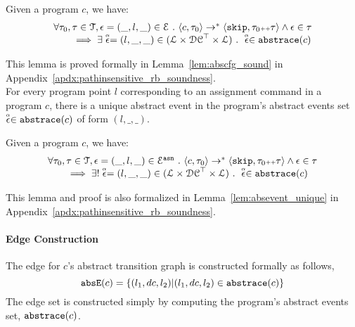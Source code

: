    \begin{lem}
     \label{lem:abscfg_sound}
   Given a program ${c}$, we have:
   \[
     \begin{array}{l}
       \forall \mathtt{\tau}_0, \mathtt{\tau} \in \mathcal{T} ,  \mathtt{\epsilon} = (\_, l, \_) \in \mathcal{E} ~.~
   \langle {c}, \mathtt{\tau}_0 \rangle \to^{*} \langle \mathtt{skip}, \mathtt{\tau}_0 {\scriptscriptstyle ++} \mathtt{\tau} \rangle 
   \land \mathtt{\epsilon} \in \mathtt{\tau} 
   \\
   \qquad \implies \exists \stackrel{\scriptscriptstyle{\alpha}}{\mathtt{\epsilon}{}} = (l, \_, \_) \in (\mathcal{L}\times \mathcal{DC}^{\top} \times \mathcal{L}) ~.~ 
   \stackrel{\scriptscriptstyle{\alpha}}{\mathtt{\epsilon}{}} \in \mathtt{abs}{\mathtt{trace}}(c)
   \end{array}
   \]
   \end{lem}
This lemma is proved formally in Lemma~\ref{lem:abscfg_sound} in Appendix~\ref{apdx:pathinsensitive_rb_soundness}.
\\
For every program point $l$ corresponding to an assignment command in a program $c$,
there is a unique abstract event in the program's abstract events set $\stackrel{\scriptscriptstyle{\alpha}}{\mathtt{\epsilon}{}} \in \mathtt{abs}{\mathtt{trace}}(c)$ of form $(l, \_, \_)$. 
\begin{lem}
  \label{lem:abscfg_unique}
Given a program ${c}$, we have:
%
\[
  \begin{array}{l}
    \forall \mathtt{\tau}_0, \mathtt{\tau} \in \mathcal{T} ,  \mathtt{\epsilon} = (\_, l, \_) \in \mathcal{E}^{\mathtt{{asn}}} ~.~
\langle {c}, \mathtt{\tau}_0 \rangle \to^{*} \langle \mathtt{skip}, \mathtt{\tau}_0 {\scriptscriptstyle ++} \mathtt{\tau} \rangle 
\land \mathtt{\epsilon} \in \mathtt{\tau} 
\\
\qquad \implies \exists! \stackrel{\scriptscriptstyle{\alpha}}{\mathtt{\epsilon}{}} = (l, \_, \_) \in (\mathcal{L}\times \mathcal{DC}^{\top} \times \mathcal{L}) ~.~ 
\stackrel{\scriptscriptstyle{\alpha}}{\mathtt{\epsilon}{}} \in \mathtt{abs}{\mathtt{trace}}(c)
\end{array}
\]
\end{lem}
This lemma and proof is also 
formalized in Lemma~\ref{lem:absevent_unique} in Appendix~\ref{apdx:pathinsensitive_rb_soundness}.

  \paragraph{Edge Construction}
The edge for $c$'s abstract transition graph is constructed formally as follows,
  \[
    \mathtt{abs}{\mathtt{E}}(c) = \{(l_1, dc, l_2) | (l_1, dc, l_2) \in \mathtt{abs}{\mathtt{trace}}(c)\}
    \]
The edge set is constructed simply by computing the program's abstract events set, $\mathtt{abs}{\mathtt{trace}}(c)$.
%

